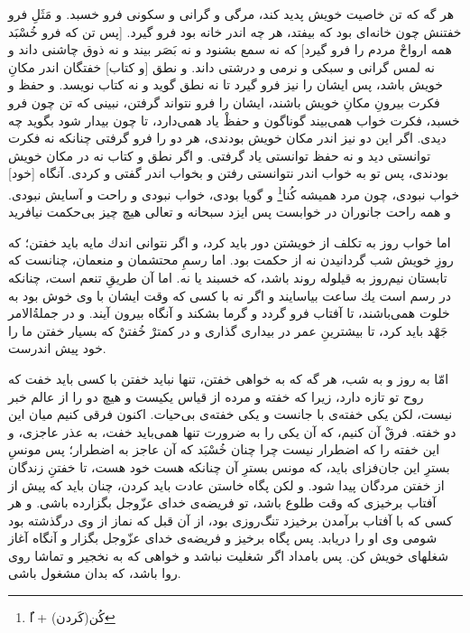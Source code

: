 هر گه كه تن خاصيت خويش پديد كند، مرگى و گرانى و سكونى فرو خسبد. و مَثَلِ فرو خفتنش چون خانه‌اى بود كه بيفتد، هر چه اندر خانه بود فرو گيرد. [پس تن كه فرو خُسْبَد همه ارواحْ مردم را فرو گيرد] كه نه  سمع بشنود و نه بَصَر بيند و نه ذوق چاشنى داند و نه لمس گرانى و سبكى و نرمى و درشتى داند. و نطق [و كتاب] خفتگان اندر مكانِ خويش باشد، پس ايشان را نيز فرو گيرد تا نه نطق گويد و نه كتاب نويسد. و حفظ و فكرت بيرونِ مكانِ خويش باشند، ايشان را فرو نتواند گرفتن، نبينى كه تن چون فرو خسبد، فكرت خواب همى‌بيند گوناگون و حفظْ ياد همى‌دارد، تا چون بيدار شود بگويد چه ديدى. اگر اين دو نيز اندر مكان خويش بودندى، هر دو را فرو گرفتى چنانكه نه فكرت توانستى ديد و نه حفظ توانستى ياد گرفتى. و اگر نطق و كتاب نه در مكان خويش بودندى، پس تو به خواب اندر نتوانستى رفتن و بخواب اندر گفتى و كردى. آنگاه [خود] خواب نبودى، چون مرد هميشه كُنا\footnote{ُکُن(کَردن) + ا} و گويا بودى، خواب نبودى و راحت و آسايش نبودى. و همه راحت جانوران در خوابست پس ايزد سبحانه و تعالى هيچ چيز بى‌حكمت نيافريد

اما خواب روز به تكلف از خويشتن دور بايد كرد، و اگر نتوانى اندك مايه بايد خفتن؛ كه روزِ خويش  شب گردانيدن نه از حكمت بود. اما رسمِ محتشمان و منعمان، چنانست كه تابستان نيم‌روز به قيلوله روند باشد، كه خسبند يا نه. اما آن طريقِ تنعم است، چنانكه در رسم است يك ساعت بياسايند و اگر نه با كسى كه وقت ايشان با وى خوش بود به خلوت همى‌باشند، تا آفتاب فرو گردد و گرما بشكند و آنگاه بيرون آيند. و در جملة‌ُالامر جَهْد بايد كرد، تا بيشترينِ عمر در بيدارى گذارى و در كمترْ خُفتنْ كه بسيار خفتن ما را خود پيش اندرست.

امّا به روز و به شب، هر گه كه به خواهى خفتن، تنها نبايد خفتن با كسى بايد خفت كه روح تو تازه دارد، زيرا كه خفته و مرده از قياس يكيست و هيچ دو را از عالم خبر نيست، لكن يكى خفته‌ی با جانست و يكى خفته‌ی بى‌حيات. اكنون فرقى كنيم ميان اين دو خفته. فرقْ آن كنيم، كه آن يكى را به ضرورت تنها همى‌بايد خفت، به عذر عاجزى، و اين خفته را كه اضطرار نيست چرا چنان خُسْبَد كه آن عاجز به اضطرار؛ پس مونسِ بسترِ اين جان‌فزاى بايد، كه مونس بسترِ آن چنانكه هست خود هست، تا خفتنِ زندگان از خفتن مردگان پيدا شود. و لكن پگاه خاستن عادت بايد كردن، چنان بايد كه پيش از آفتاب برخيزى كه وقت طلوع باشد، تو فريضه‌ی خداى عزّ‌و‌جل بگزارده باشى. و هر كسى كه با آفتاب برآمدن برخيزد تنگ‌روزى بود، از آن قبل كه نماز از وى درگذشته بود شومى وى او را دريابد. پس پگاه برخيز و فريضه‌ی خداى عزّوجل بگزار و آنگاه آغاز شغلهاى خويش كن. پس بامداد اگر شغليت نباشد و خواهى كه به نخجير و تماشا روى روا باشد، كه بدان مشغول باشى.



\newpage














































